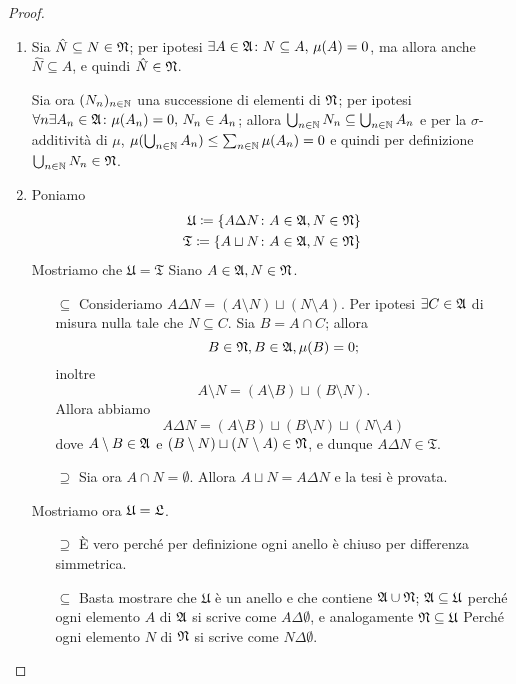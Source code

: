 \documentclass[../EserciziIstituzioniAnalisi.tex]{subfiles}
\begin{document}
\begin{proof}
  \begin{enumerate}
    \item Sia $\hat N\subseteq N \in \mathfrak N$; per ipotesi $\exists A\in \mathfrak A \colon N \subseteq A,\, \mu(A)=0$, ma allora anche $\hat N \subseteq A$, e quindi $\hat N \in \mathfrak N$.

    Sia ora $(N_n)_{n \in\mathbb N}$ una successione di elementi di $\mathfrak N$; per ipotesi $\forall n \exists A_n\in \mathfrak A \colon \mu(A_n)=0,\, N_n\in A_n$; allora $\bigcup_{n \in \mathbb N} N_n\subseteq \bigcup_{n \in \mathbb N} A_n$ e per la $\sigma$-additività di $\mu$, $\mu(\bigcup_{n \in \mathbb N} A_n)\leq \sum_{n\in\mathbb N}\mu(A_n)=0$ e quindi per definizione $\bigcup_{n \in \mathbb N} N_n\in \mathfrak N$.
    \item Poniamo
    \begin{equation*}
      \begin{aligned}
        \mathfrak{U}\coloneqq \left\{A\Delta N\colon A\in\mathfrak A,N\in\mathfrak N\right\}\\
        \mathfrak{T}\coloneqq \left\{A\sqcup N\colon A\in\mathfrak A,N\in\mathfrak N\right\}
      \end{aligned}
    \end{equation*}
    Mostriamo che $\mathfrak{U}=\mathfrak{T}$
    Siano $A\in\mathfrak A,N\in\mathfrak N$.
    \begin{itemize}
      \item[$\subseteq$] Consideriamo $A\Delta N=(A\setminus N)\sqcup (N\setminus A)$. Per ipotesi $\exists C\in\mathfrak A$ di misura nulla tale che $N\subseteq C$. Sia $B=A\cap C$; allora
      \begin{equation*}
        B\in\mathfrak N, B\in\mathfrak A, \mu(B)=0;
      \end{equation*}
      inoltre
      \begin{equation*}
        A\setminus N=(A\setminus B)\sqcup (B\setminus N).
      \end{equation*}
      Allora abbiamo
      \begin{equation*}
        A\Delta N=(A\setminus B)\sqcup (B\setminus N)\sqcup (N\setminus A)
      \end{equation*}
      dove $A\setminus B\in \mathfrak A$ e $(B\setminus N)\sqcup (N\setminus A)\in \mathfrak N$, e dunque $A\Delta N\in \mathfrak{T}$.
      \item[$\supseteq$] Sia ora $A\cap N=\emptyset$. Allora $A\sqcup N=A\Delta N$ e la tesi è provata.
    \end{itemize}
    Mostriamo ora $\mathfrak{U}=\mathfrak L$.
    \begin{itemize}
      \item[$\supseteq$] È vero perché per definizione ogni anello è chiuso per differenza simmetrica.
      \item[$\subseteq$] Basta mostrare che $\mathfrak{U}$ è un anello e che contiene $\mathfrak A\cup\mathfrak N$; $\mathfrak A\subseteq\mathfrak{U}$ perché ogni elemento $A$ di $\mathfrak A$ si scrive come $A\Delta \emptyset$, e analogamente  $\mathfrak N\subseteq\mathfrak{U}$ Perché ogni elemento $N$ di $\mathfrak N$ si scrive come $N\Delta \emptyset$.
      

\end{itemize}
\end{enumerate}
\end{proof}
\end{document}
